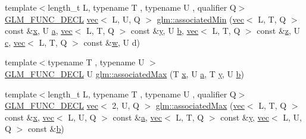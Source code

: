 \begin{DoxyCompactItemize}
\item 
{\footnotesize template$<$length\+\_\+t L, typename T , typename U , qualifier Q$>$ }\\\mbox{\hyperlink{setup_8hpp_ab2d052de21a70539923e9bcbf6e83a51}{G\+L\+M\+\_\+\+F\+U\+N\+C\+\_\+\+D\+E\+CL}} \mbox{\hyperlink{structglm_1_1vec}{vec}}$<$ L, U, Q $>$ \mbox{\hyperlink{group__gtx__associated__min__max_ga2db7e351994baee78540a562d4bb6d3b}{glm\+::associated\+Min}} (\mbox{\hyperlink{structglm_1_1vec}{vec}}$<$ L, T, Q $>$ const \&\mbox{\hyperlink{_s_d_l__opengl_8h_ad0e63d0edcdbd3d79554076bf309fd47}{x}}, U \mbox{\hyperlink{_s_d_l__opengl__glext_8h_a3309789fc188587d666cda5ece79cf82}{a}}, \mbox{\hyperlink{structglm_1_1vec}{vec}}$<$ L, T, Q $>$ const \&\mbox{\hyperlink{_s_d_l__opengl_8h_a1675d9d7bb68e1657ff028643b4037e3}{y}}, U \mbox{\hyperlink{_s_d_l__opengl__glext_8h_a0f71581a41fd2264c8944126dabbd010}{b}}, \mbox{\hyperlink{structglm_1_1vec}{vec}}$<$ L, T, Q $>$ const \&\mbox{\hyperlink{_s_d_l__opengl__glext_8h_a5e74030ebb3297ce1b37ff716fedd68f}{z}}, U \mbox{\hyperlink{_s_d_l__opengl__glext_8h_a1f2d7f8147412c43ba2303a56f97ee73}{c}}, \mbox{\hyperlink{structglm_1_1vec}{vec}}$<$ L, T, Q $>$ const \&\mbox{\hyperlink{_s_d_l__opengl__glext_8h_a6ee8f168a7ab6785a9bb57c6715dad99}{w}}, U d)
\item 
{\footnotesize template$<$typename T , typename U $>$ }\\\mbox{\hyperlink{setup_8hpp_ab2d052de21a70539923e9bcbf6e83a51}{G\+L\+M\+\_\+\+F\+U\+N\+C\+\_\+\+D\+E\+CL}} U \mbox{\hyperlink{group__gtx__associated__min__max_ga7d9c8785230c8db60f72ec8975f1ba45}{glm\+::associated\+Max}} (T \mbox{\hyperlink{_s_d_l__opengl_8h_ad0e63d0edcdbd3d79554076bf309fd47}{x}}, U \mbox{\hyperlink{_s_d_l__opengl__glext_8h_a3309789fc188587d666cda5ece79cf82}{a}}, T \mbox{\hyperlink{_s_d_l__opengl_8h_a1675d9d7bb68e1657ff028643b4037e3}{y}}, U \mbox{\hyperlink{_s_d_l__opengl__glext_8h_a0f71581a41fd2264c8944126dabbd010}{b}})
\item 
{\footnotesize template$<$length\+\_\+t L, typename T , typename U , qualifier Q$>$ }\\\mbox{\hyperlink{setup_8hpp_ab2d052de21a70539923e9bcbf6e83a51}{G\+L\+M\+\_\+\+F\+U\+N\+C\+\_\+\+D\+E\+CL}} \mbox{\hyperlink{structglm_1_1vec}{vec}}$<$ 2, U, Q $>$ \mbox{\hyperlink{group__gtx__associated__min__max_ga5c6758bc50aa7fbe700f87123a045aad}{glm\+::associated\+Max}} (\mbox{\hyperlink{structglm_1_1vec}{vec}}$<$ L, T, Q $>$ const \&\mbox{\hyperlink{_s_d_l__opengl_8h_ad0e63d0edcdbd3d79554076bf309fd47}{x}}, \mbox{\hyperlink{structglm_1_1vec}{vec}}$<$ L, U, Q $>$ const \&\mbox{\hyperlink{_s_d_l__opengl__glext_8h_a3309789fc188587d666cda5ece79cf82}{a}}, \mbox{\hyperlink{structglm_1_1vec}{vec}}$<$ L, T, Q $>$ const \&\mbox{\hyperlink{_s_d_l__opengl_8h_a1675d9d7bb68e1657ff028643b4037e3}{y}}, \mbox{\hyperlink{structglm_1_1vec}{vec}}$<$ L, U, Q $>$ const \&\mbox{\hyperlink{_s_d_l__opengl__glext_8h_a0f71581a41fd2264c8944126dabbd010}{b}})

\end{DoxyCompactItemize}
